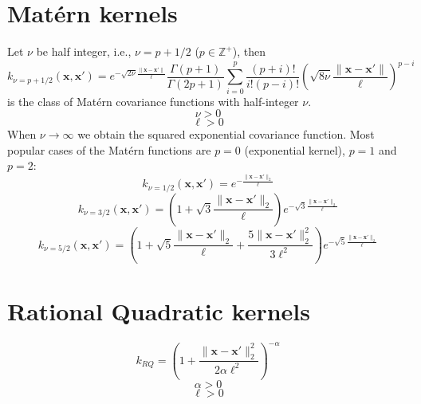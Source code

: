 \documentclass[a4paper,11pt]{article}
\newcommand\x{{\mathbf x}}
\newcommand\K{{\mathbf K}}
\begin{document}
\section{Mat\'ern kernels}
Let $\nu$ be half integer, i.e., $\nu = p + 1/2$ ($p \in
\mathbb{Z}^+$), then
$$k_{\nu=p+1/2}(\x,\x') = e^{-\sqrt{2\nu}\frac{\|\x-\x'\|}{\ell}}
\frac{\Gamma(p+1)}{\Gamma(2p+1)} \sum_{i=0}^p
\frac{(p+i)!}{i!(p-i)!}\left(\sqrt{8\nu}\frac{\|\x-\x'\|}{\ell}\right)^{p-i}$$
is the class of Mat\'ern covariance functions with half-integer $\nu$.
$$\nu > 0$$
$$\ell > 0$$
When $\nu \rightarrow \infty$ we obtain the squared exponential
covariance function. Most popular cases of the Mat\'ern functions are
$p=0$ (exponential kernel), $p=1$ and $p=2$:
$$k_{\nu=1/2}(\x,\x') = e^{-\frac{\|\x-\x'\|_2}{\ell}}$$
$$k_{\nu=3/2}(\x,\x') = \left(1+\sqrt{3}\frac{\|\x-\x'\|_2}{\ell}
\right) e^{-\sqrt{3}\frac{\|\x-\x'\|_2}{\ell}}$$ 
$$k_{\nu=5/2}(\x,\x') = \left(1+\sqrt{5}\frac{\|\x-\x'\|_2}{\ell}
 + \frac{5\|\x-\x'\|_2^2}{3\ell^2}\right)
e^{-\sqrt{5}\frac{\|\x-\x'\|_2}{\ell}}$$


\section{Rational Quadratic kernels}
$$k_{RQ} = \left(1+\frac{\|\x-\x'\|_2^2}{2\alpha\ell^2}
\right)^{-\alpha}$$
$$\alpha > 0$$
$$\ell > 0$$
\end{document}
